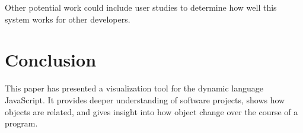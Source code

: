 \documentclass[]{article}
\begin{document}
Other potential work could include user studies to determine how well this system works for other developers.

\section{Conclusion}
\label{sec:conclusion}
This paper has presented a visualization tool for the dynamic language JavaScript. It provides  deeper understanding of software projects, shows how objects are related, and gives insight into how object change over the course of a program.



\end{document}
